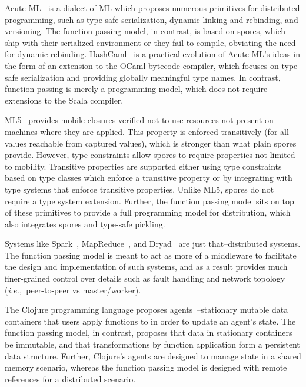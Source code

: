 \documentclass[10pt]{sigplanconf}
\theoremstyle{definition}
\theoremstyle{definition}
\newcommand{\ie}{{\em i.e.,~}}
\begin{document}
Acute ML~\cite{AcuteML} is a dialect of ML which proposes numerous primitives
for distributed programming, such as type-safe serialization, dynamic linking
and rebinding, and versioning. The function passing model, in contrast, is based on spores, which ship
with their serialized environment or they fail to compile, obviating the need
for dynamic rebinding. HashCaml~\cite{DistOCaml} is a practical evolution of
Acute ML's ideas in the form of an extension to the OCaml bytecode compiler,
which focuses on type-safe serialization and providing globally meaningful type
names. In contrast, function passing is merely a programming model, which does not require
extensions to the Scala compiler.


ML5~\cite{Tom7} provides mobile closures verified not to use resources not
present on machines where they are applied. This property is enforced
transitively (for all values reachable from captured values), which is stronger
than what plain spores provide. However, type constraints allow spores to
require properties not limited to mobility. Transitive properties are supported
either using type constraints based on type classes which enforce a transitive
property or by integrating with type systems that enforce transitive
properties. Unlike ML5, spores do not require a type system extension. Further,
the function passing model sits on top of these primitives to provide a full programming
model for distribution, which also integrates spores and type-safe pickling.


Systems like Spark~\cite{Spark}, MapReduce~\cite{MapReduce}, and
Dryad~\cite{Dryad} are just that--distributed systems. The function passing model is meant to act as
more of a middleware to facilitate the design and implementation of such
systems, and as a result provides much finer-grained control over details such
as fault handling and network topology (\ie peer-to-peer vs master/worker).

The Clojure programming language proposes agents~\cite{Clojure}--stationary
mutable data containers that users apply functions to in order to update an
agent's state. The function passing model, in contrast, proposes that data in stationary containers be
immutable, and that transformations by function application form a persistent
data structure. Further, Clojure's agents are designed to manage state in a
shared memory scenario, whereas the function passing model is designed with remote references for a
distributed scenario.
\end{document}

